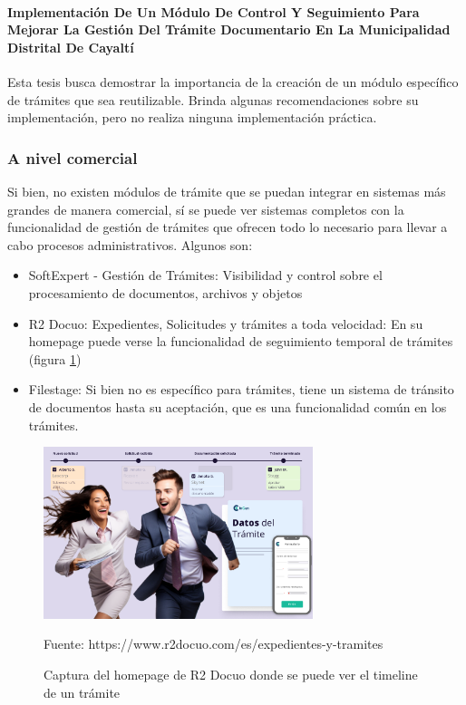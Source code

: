 \paragraph{Implementación De Un Módulo De Control Y Seguimiento Para Mejorar La Gestión Del Trámite Documentario En La Municipalidad Distrital De Cayaltí}

Esta tesis busca demostrar la importancia de la creación de un módulo específico de trámites que sea reutilizable. Brinda algunas recomendaciones sobre su implementación, pero no realiza ninguna implementación práctica.

\subsubsection{A nivel comercial}

Si bien, no existen módulos de trámite que se puedan integrar en sistemas más grandes de manera comercial, sí se puede ver sistemas completos con la funcionalidad de gestión de trámites que ofrecen todo lo necesario para llevar a cabo procesos administrativos. Algunos son:

\begin{itemize}
    \item SoftExpert - Gestión de Trámites: Visibilidad y control sobre el procesamiento de documentos, archivos y objetos
    \item R2 Docuo: Expedientes, Solicitudes y trámites a toda velocidad: En su homepage puede verse la funcionalidad de seguimiento temporal de trámites (figura \ref{fig:r2docuotimeline})
    \item Filestage: Si bien no es específico para trámites, tiene un sistema de tránsito de documentos hasta su aceptación, que es una funcionalidad común en los trámites.
\end{itemize}

\begin{figure}[!h]
    \centering
    \includegraphics[width=0.7\textwidth]{assets/r2docuotimeline}
    \caption{Captura del homepage de R2 Docuo donde se puede ver el timeline de un trámite}{Fuente: https://www.r2docuo.com/es/expedientes-y-tramites}
    \label{fig:r2docuotimeline}
\end{figure}

